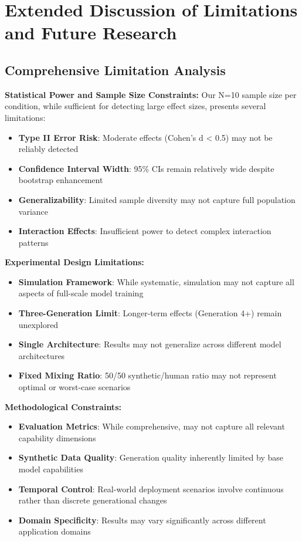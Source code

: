 \documentclass{article}
\begin{document}
\section{Extended Discussion of Limitations and Future Research}
\label{appendix:limitations_future}

\subsection{Comprehensive Limitation Analysis}

\textbf{Statistical Power and Sample Size Constraints:}
Our N=10 sample size per condition, while sufficient for detecting large effect sizes, presents several limitations:
\begin{itemize}
    \item \textbf{Type II Error Risk}: Moderate effects (Cohen's d < 0.5) may not be reliably detected
    \item \textbf{Confidence Interval Width}: 95\% CIs remain relatively wide despite bootstrap enhancement
    \item \textbf{Generalizability}: Limited sample diversity may not capture full population variance
    \item \textbf{Interaction Effects}: Insufficient power to detect complex interaction patterns
\end{itemize}

\textbf{Experimental Design Limitations:}
\begin{itemize}
    \item \textbf{Simulation Framework}: While systematic, simulation may not capture all aspects of full-scale model training
    \item \textbf{Three-Generation Limit}: Longer-term effects (Generation 4+) remain unexplored
    \item \textbf{Single Architecture}: Results may not generalize across different model architectures
    \item \textbf{Fixed Mixing Ratio}: 50/50 synthetic/human ratio may not represent optimal or worst-case scenarios
\end{itemize}

\textbf{Methodological Constraints:}
\begin{itemize}
    \item \textbf{Evaluation Metrics}: While comprehensive, may not capture all relevant capability dimensions
    \item \textbf{Synthetic Data Quality}: Generation quality inherently limited by base model capabilities
    \item \textbf{Temporal Control}: Real-world deployment scenarios involve continuous rather than discrete generational changes
    \item \textbf{Domain Specificity}: Results may vary significantly across different application domains
\end{itemize}
\end{document}
